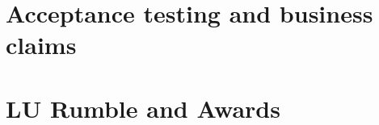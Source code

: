 \documentclass{scrreprt}
\begin{document}

\section{Acceptance testing and business claims}

\section{LU Rumble and Awards}
\end{document}
